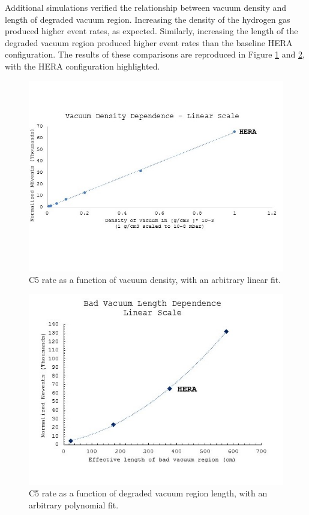 Additional simulations verified the relationship between vacuum density and length of degraded vacuum region.  Increasing the density of the hydrogen gas produced higher event rates, as expected.  Similarly, increasing the length of the degraded vacuum region produced higher event rates than the baseline HERA configuration.  The results of these comparisons are reproduced in Figure \ref{fig:hera5} and \ref{fig:hera6}, with the HERA configuration highlighted.

\begin{figure}[!hbt]
	\centering
	\includegraphics[width=.75\textwidth]{../../img/density_dep_lin_crop.jpg}
	\caption {C5 rate as a function of vacuum density, with an arbitrary linear fit.}
	\label{fig:hera5}
\end{figure}	

\begin{figure}[!hbt]
	\centering	\includegraphics[width=.75\textwidth]{../../img/length_dep_poly_crop.jpg}	
	\caption {C5 rate as a function of degraded vacuum region length, with an arbitrary polynomial fit.}
	\label{fig:hera6}
\end{figure}



